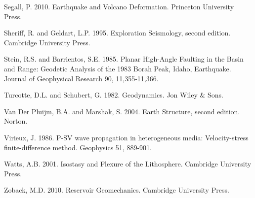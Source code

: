 \documentclass[a4paper , 12pt]{book}
\begin{document}
Segall, P. 2010. Earthquake and Volcano Deformation. Princeton University Press.

Sheriff, R. and Geldart, L.P. 1995. Exploration Seismology, second edition. Cambridge University Press.

Stein, R.S. and Barrientos, S.E. 1985. Planar High-Angle Faulting in the Basin and Range: Geodetic Analysis of the 1983 Borah Peak, Idaho, Earthquake. Journal of Geophysical Research 90, 11,355-11,366.

Turcotte, D.L. and Schubert, G. 1982. Geodynamics. Jon Wiley $\&$ Sons.

Van Der Pluijm, B.A. and Marshak, S. 2004. Earth Structure, second edition. Norton.

Virieux, J. 1986. P-SV wave propagation in heterogeneous media:  Velocity-stress finite-difference method. Geophysics 51, 889-901.

Watts, A.B. 2001. Isostasy and Flexure of the Lithosphere. Cambridge University Press.

Zoback, M.D. 2010. Reservoir Geomechanics. Cambridge University Press.
\end{document}
